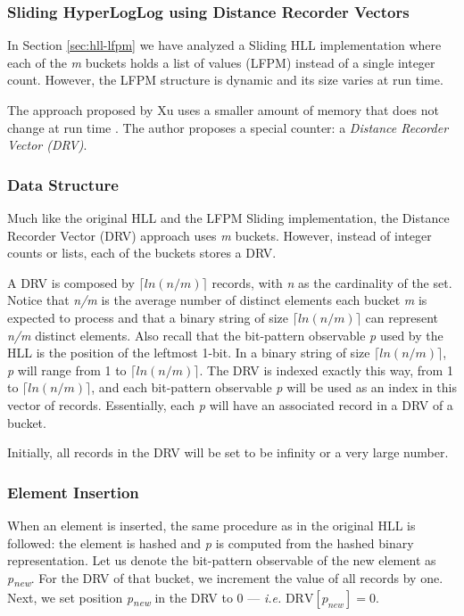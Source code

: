 \subsubsection{Sliding HyperLogLog using Distance Recorder Vectors} \label{sec:hll-drv}

In Section \ref{sec:hll-lfpm} we have analyzed a Sliding HLL implementation where each of the \textit{m} buckets holds a list of values (LFPM) instead of a single integer count. However, the LFPM structure is dynamic and its size varies at run time. 

The approach proposed by Xu uses a smaller amount of memory that does not change at run time \cite{Xu-hll-sliding-drv}. The author proposes a special counter: a \textit{Distance Recorder Vector (DRV)}. 

\subsubsection*{Data Structure}
Much like the original HLL and the LFPM Sliding implementation, the Distance Recorder Vector (DRV) approach uses \textit{m} buckets. However, instead of integer counts or lists, each of the buckets stores a DRV. 

A DRV is composed by \textit{$\lceil ln(n/m) \rceil$} records, with \textit{n} as the cardinality of the set. Notice that \textit{n/m} is the average number of distinct elements each bucket \textit{m} is expected to process and that a binary string of size \textit{$\lceil ln(n/m) \rceil$} can represent \textit{n/m} distinct elements. Also recall that the bit-pattern observable \textit{p} used by the HLL is the position of the leftmost 1-bit. In a binary string of size \textit{$\lceil ln(n/m) \rceil$}, \textit{p} will range from 1 to \textit{$\lceil ln(n/m) \rceil$}. The DRV is indexed exactly this way, from 1 to \textit{$\lceil ln(n/m) \rceil$}, and each bit-pattern observable \textit{p} will be used as an index in this vector of records. Essentially, each \textit{p} will have an associated record in a DRV of a bucket.

Initially, all records in the DRV will be set to be infinity or a very large number.

\subsubsection*{Element Insertion}
When an element is inserted, the same procedure as in the original HLL is followed: the element is hashed and \textit{p} is computed from the hashed binary representation. Let us denote the bit-pattern observable of the new element as \textit{p\textsubscript{new}}. For the DRV of that bucket, we increment the value of all records by one. Next, we set position \textit{p\textsubscript{new}} in the DRV to 0 --- \textit{i.e.} $\textrm{DRV}[p_{new}] = 0$.



